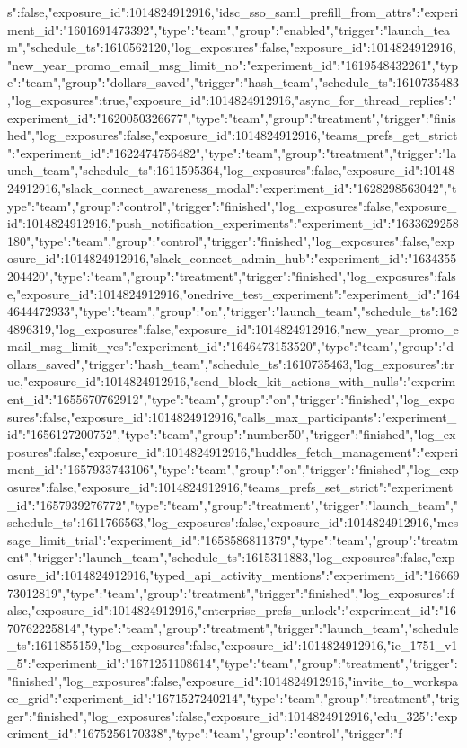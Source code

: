 {s":false,"exposure_id":1014824912916},"idsc_sso_saml_prefill_from_attrs":{"experiment_id":"1601691473392","type":"team","group":"enabled","trigger":"launch_team","schedule_ts":1610562120,"log_exposures":false,"exposure_id":1014824912916},"new_year_promo_email_msg_limit_no":{"experiment_id":"1619548432261","type":"team","group":"dollars_saved","trigger":"hash_team","schedule_ts":1610735483,"log_exposures":true,"exposure_id":1014824912916},"async_for_thread_replies":{"experiment_id":"1620050326677","type":"team","group":"treatment","trigger":"finished","log_exposures":false,"exposure_id":1014824912916},"teams_prefs_get_strict":{"experiment_id":"1622474756482","type":"team","group":"treatment","trigger":"launch_team","schedule_ts":1611595364,"log_exposures":false,"exposure_id":1014824912916},"slack_connect_awareness_modal":{"experiment_id":"1628298563042","type":"team","group":"control","trigger":"finished","log_exposures":false,"exposure_id":1014824912916},"push_notification_experiments":{"experiment_id":"1633629258180","type":"team","group":"control","trigger":"finished","log_exposures":false,"exposure_id":1014824912916},"slack_connect_admin_hub":{"experiment_id":"1634355204420","type":"team","group":"treatment","trigger":"finished","log_exposures":false,"exposure_id":1014824912916},"onedrive_test_experiment":{"experiment_id":"1644644472933","type":"team","group":"on","trigger":"launch_team","schedule_ts":1624896319,"log_exposures":false,"exposure_id":1014824912916},"new_year_promo_email_msg_limit_yes":{"experiment_id":"1646473153520","type":"team","group":"dollars_saved","trigger":"hash_team","schedule_ts":1610735463,"log_exposures":true,"exposure_id":1014824912916},"send_block_kit_actions_with_nulls":{"experiment_id":"1655670762912","type":"team","group":"on","trigger":"finished","log_exposures":false,"exposure_id":1014824912916},"calls_max_participants":{"experiment_id":"1656127200752","type":"team","group":"number50","trigger":"finished","log_exposures":false,"exposure_id":1014824912916},"huddles_fetch_management":{"experiment_id":"1657933743106","type":"team","group":"on","trigger":"finished","log_exposures":false,"exposure_id":1014824912916},"teams_prefs_set_strict":{"experiment_id":"1657939276772","type":"team","group":"treatment","trigger":"launch_team","schedule_ts":1611766563,"log_exposures":false,"exposure_id":1014824912916},"message_limit_trial":{"experiment_id":"1658586811379","type":"team","group":"treatment","trigger":"launch_team","schedule_ts":1615311883,"log_exposures":false,"exposure_id":1014824912916},"typed_api_activity_mentions":{"experiment_id":"1666973012819","type":"team","group":"treatment","trigger":"finished","log_exposures":false,"exposure_id":1014824912916},"enterprise_prefs_unlock":{"experiment_id":"1670762225814","type":"team","group":"treatment","trigger":"launch_team","schedule_ts":1611855159,"log_exposures":false,"exposure_id":1014824912916},"ie_1751_v1_5":{"experiment_id":"1671251108614","type":"team","group":"treatment","trigger":"finished","log_exposures":false,"exposure_id":1014824912916},"invite_to_workspace_grid":{"experiment_id":"1671527240214","type":"team","group":"treatment","trigger":"finished","log_exposures":false,"exposure_id":1014824912916},"edu_325":{"experiment_id":"1675256170338","type":"team","group":"control","trigger":"f}
